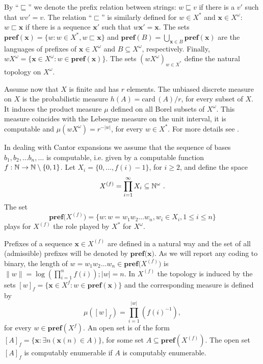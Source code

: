 \documentclass{elsart}
\begin{document}
By ``$\sqsubseteq$'' we denote the prefix relation between strings:
$w\sqsubseteq v$ if there is a $v'$ such that $w v'= v$.  The relation
``$\sqsubset$'' is similarly defined for $w\in X^{*}$ and ${\mathbf x} \in
X^{\omega}$:
$w\sqsubset{\mathbf x}$ if there is a sequence ${\mathbf x}'$ such that $w{\mathbf x}'= {\mathbf x}$. The sets
${{\mathbf{pref}({{\mathbf x}})}} =\{w : w\in X^*,  w\sqsubset{\mathbf x}\}$
and ${{\mathbf{pref}({B})}}=\bigcup_{{\mathbf x}\in
  B}{{\mathbf{pref}({{\mathbf x}})}}$ are the languages of
prefixes of ${\mathbf x} \in X^{\omega}$ and $B
\subseteq X^{\omega} $, respectively. Finally, $wX^{\omega} = \{{\mathbf x} \in
X^{\omega} : w\in{{\mathbf{pref}({{\mathbf x}})}} \}.$
The sets $(wX^{\omega})_{w\in X^*}$ define
the
natural topology on $X^{\omega}$.

Assume now that $X$ is finite and has $r$ elements. The unbiased discrete
measure on $X$ is the probabilistic measure $h (A) =
{\mathrm{card}\,}(A)/r$, for every subset of $X$. It induces the product measure $\mu$
defined on all Borel subsets of $X^{\omega}$. This measure coincides with
the
Lebesgue measure on the unit interval, it is computable and $\mu(w
X^{\omega})
= r^{-|w|}$, for every $w \in X^{*}$. For more details see
\cite{martin-lof,mar2,calude:02}.


In dealing with  Cantor expansions we  assume that the sequence of bases
$b_1, b_2, \ldots b_n, \ldots$ is computable, i.e.  given by a computable
function  $f:\Bbb{N}\to \Bbb{N}\setminus\{0,1\}$. Let  $X_i=\{0,\dots,
f(i)-1\}$, for
$i\ge 2$,  and define the space $$X^{(f)} = \prod_{i=1}^\infty X_i\subseteq
\Bbb{N}^\omega\ .$$
The set
$${\mathbf{pref}({{X^{(f)}})}} = \{ w : w = w_1 w_2 \ldots w_n, w_i \in X_i, 1 \le i \le
n\}$$
plays for $X^{(f)}$ the role played by $X^*$ for $X^{\omega}$.

Prefixes of a sequence ${\mathbf x} \in X^{(f)}$  are defined in a natural way and
the set of all (admissible) prefixes  will be denoted by
${{\mathbf{pref}({{\mathbf x}}})}$.  As we
will report any coding to binary, the length of $w= w_1 w_2 \ldots w_n\in
{\mathbf{pref}({{X^{(f)}})}}$ is
$\parallel w \parallel = \log (\prod_{i=1}^{n} f(i)); |w| =n$. In $X^{(f)}$
the topology is induced by the
sets $[w]_{f} = \{{\mathbf x} \in X^{f} : w\in {\mathbf{pref}({{\mathbf x}})} \}$ and the corresponding measure is defined by
$$\mu([w]_{f})
= \prod_{i=1}^{|w|} (f(i)^{-1}),$$ for every $w \in {{\mathbf{pref}({X^{f}})}}$.
An open set is of the form $[A]_f = \{{\mathbf x} : \exists n ({\mathbf x}(n)\in A)\}$, for some set
$A\subseteq
{{\mathbf{pref}({{X^{(f)}}})}}$. The open set $[A]_f$ is computably enumerable if $A$ is
computably enumerable.
\end{document}
